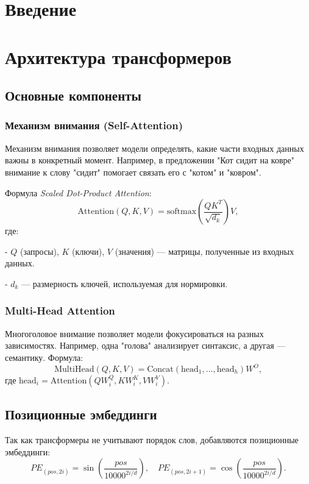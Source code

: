 \documentclass[14pt]{article}
\theoremstyle{definition}
\begin{document}
\pagebreake[2]


\newpage
\tableofcontents
\newpage
\section{Введение}

\newpage

\section{Архитектура трансформеров}
\subsection{Основные компоненты}
\subsubsection{Механизм внимания (Self-Attention)}
Механизм внимания позволяет модели определять, какие части входных данных важны в конкретный момент. Например, в предложении "Кот сидит на ковре" внимание к слову "сидит" помогает связать его с "котом" и "ковром".

Формула \textit{Scaled Dot-Product Attention}:
\[
\text{Attention}(Q, K, V) = \text{softmax}\left(\frac{QK^T}{\sqrt{d_k}}\right)V,
\]
где:

    
- \(Q\) (запросы), \(K\) (ключи), \(V\) (значения) — матрицы, полученные из входных данных.
    
- \(d_k\) — размерность ключей, используемая для нормировки.


\subsubsection{Multi-Head Attention}
Многоголовое внимание позволяет модели фокусироваться на разных зависимостях. Например, одна "голова" анализирует синтаксис, а другая — семантику. Формула:
\[
\text{MultiHead}(Q, K, V) = \text{Concat}(\text{head}_1, ..., \text{head}_h)W^O,
\]
где \(\text{head}_i = \text{Attention}(QW_i^Q, KW_i^K, VW_i^V)\).

\subsection{Позиционные эмбеддинги}
Так как трансформеры не учитывают порядок слов, добавляются позиционные эмбеддинги:
\[
PE_{(pos, 2i)} = \sin\left(\frac{pos}{10000^{2i/d}}\right), \quad PE_{(pos, 2i+1)} = \cos\left(\frac{pos}{10000^{2i/d}}\right).
\]
\end{document}
